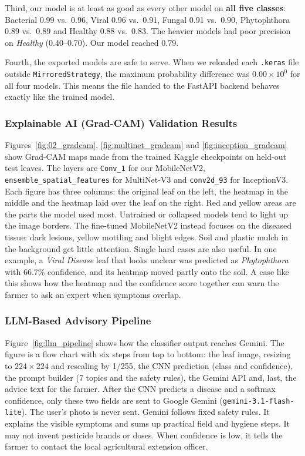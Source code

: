 Third, our model is at least as good as every other model on \textbf{all five classes}: Bacterial 0.99 vs.\ 0.96, Viral 0.96 vs.\ 0.91, Fungal 0.91 vs.\ 0.90, Phytophthora 0.89 vs.\ 0.89 and Healthy 0.88 vs.\ 0.83. The heavier models had poor precision on \textit{Healthy} (0.40--0.70). Our model reached 0.79.

Fourth, the exported models are safe to serve. When we reloaded each \texttt{.keras} file outside \texttt{MirroredStrategy}, the maximum probability difference was $0.00 \times 10^{0}$ for all four models. This means the file handed to the FastAPI backend behaves exactly like the trained model.

\subsubsection{Explainable AI (Grad-CAM) Validation Results}
Figures~\ref{fig:02_gradcam}, \ref{fig:multinet_gradcam} and \ref{fig:inception_gradcam} show Grad-CAM maps made from the trained Kaggle checkpoints on held-out test leaves. The layers are \texttt{Conv\_1} for our MobileNetV2, \texttt{ensemble\_\allowbreak spatial\_\allowbreak features} for MultiNet-V3 and \texttt{conv2d\_93} for InceptionV3. Each figure has three columns: the original leaf on the left, the heatmap in the middle and the heatmap laid over the leaf on the right. Red and yellow areas are the parts the model used most. Untrained or collapsed models tend to light up the image borders. The fine-tuned MobileNetV2 instead focuses on the diseased tissue: dark lesions, yellow mottling and blight edges. Soil and plastic mulch in the background get little attention. Single hard cases are also useful. In one example, a \textit{Viral Disease} leaf that looks unclear was predicted as \textit{Phytophthora} with 66.7\% confidence, and its heatmap moved partly onto the soil. A case like this shows how the heatmap and the confidence score together can warn the farmer to ask an expert when symptoms overlap.

\subsubsection{LLM-Based Advisory Pipeline}
Figure~\ref{fig:llm_pipeline} shows how the classifier output reaches Gemini. The figure is a flow chart with six steps from top to bottom: the leaf image, resizing to $224 \times 224$ and rescaling by 1/255, the CNN prediction (class and confidence), the prompt builder (7 topics and the safety rules), the Gemini API and, last, the advice text for the farmer. After the CNN predicts a disease and a softmax confidence, only these two fields are sent to Google Gemini (\texttt{gemini-3.1-flash-lite}). The user's photo is never sent. Gemini follows fixed safety rules. It explains the visible symptoms and sums up practical field and hygiene steps. It may not invent pesticide brands or doses. When confidence is low, it tells the farmer to contact the local agricultural extension officer.

